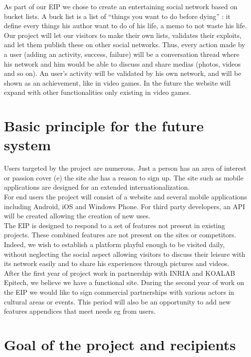\documentclass{life-fr}
\begin{document}
As part of our EIP we chose to create an entertaining social network based on bucket lists. A buck list is a list of ``things you want to do before dying'' : it define every things his author want to do of his life, a memo to not waste his life. Our project will let our visitors to make their own lists, validates their exploits, and let them publish these on other social networks. Thus, every action made by a user (adding an activity, success, failure) will be a conversation thread where his network and him would be able to discuss and share medias (photos, videos and so on). An user's activity will be validated by his own network, and will be shown as an achievement, like in video games. In the future the website will expand with other functionalities only existing in video games.

\section{Basic principle for the future system}

Users targeted by the project are numerous. Just a person has an area of interest or passion cover (e) the site she has a reason to sign up. The site such as mobile applications are designed for an extended internationalization.\\

For end users the project will consist of a website and several mobile applications including Android, iOS and Windows Phone. For third party developers, an API will be created allowing the creation of new uses.\\

The EIP is designed to respond to a set of features not present in existing projects. These combined features are not present on the sites or competitors. Indeed, we wish to establish a platform playful enough to be visited daily, without neglecting the social aspect allowing visitors to discuss their leisure with its network easily and to share his experiences through pictures and videos.\\

After the first year of project work in partnership with INRIA and KOALAB Epitech, we believe we have a functional site. During the second year of work on the EIP we would like to sign commercial partnerships with various actors in cultural areas or events. This period will also be an opportunity to add new features appendices that meet needs eg from users.

\section{Goal of the project and recipients}
\end{document}
